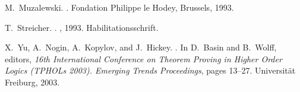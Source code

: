 \documentclass[numreferences]{kluwer}
\begin{document}
\begin{article}
\begin{thebibliography}{99}
M.~Muzalewski.
.
\newblock Fondation Philippe le Hodey, Brussels, 1993.

T.~Streicher.
.
, 1993.
\newblock Habilitationsschrift.

X.~Yu, A.~Nogin, A.~Kopylov, and J.~Hickey.
.
\newblock In D.~Basin and B.~Wolff, editors, {\em 16th International
  Conference on Theorem Proving in Higher Order Logics (TPHOLs 2003). Emerging
  Trends Proceedings}, pages 13--27. Universit{\"a}t Freiburg, 2003.
\end{thebibliography}

\end{article}
\end{document}
